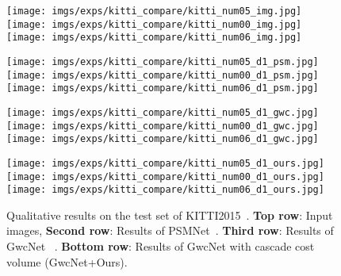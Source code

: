 \documentclass[10pt,twocolumn,letterpaper]{article}
\begin{document}
\begin{figure*}[t!]
\begin{center}
\def\col_k{0.30}
{\texttt{[image: imgs/exps/kitti\_compare/kitti\_num05\_img.jpg]}}
{\texttt{[image: imgs/exps/kitti\_compare/kitti\_num00\_img.jpg]}}
{\texttt{[image: imgs/exps/kitti\_compare/kitti\_num06\_img.jpg]}}

{\texttt{[image: imgs/exps/kitti\_compare/kitti\_num05\_d1\_psm.jpg]}}
{\texttt{[image: imgs/exps/kitti\_compare/kitti\_num00\_d1\_psm.jpg]}}
{\texttt{[image: imgs/exps/kitti\_compare/kitti\_num06\_d1\_psm.jpg]}}

{\texttt{[image: imgs/exps/kitti\_compare/kitti\_num05\_d1\_gwc.jpg]}}
{\texttt{[image: imgs/exps/kitti\_compare/kitti\_num00\_d1\_gwc.jpg]}}
{\texttt{[image: imgs/exps/kitti\_compare/kitti\_num06\_d1\_gwc.jpg]}}

{\texttt{[image: imgs/exps/kitti\_compare/kitti\_num05\_d1\_ours.jpg]}}
{\texttt{[image: imgs/exps/kitti\_compare/kitti\_num00\_d1\_ours.jpg]}}
{\texttt{[image: imgs/exps/kitti\_compare/kitti\_num06\_d1\_ours.jpg]}}

\end{center}
\vspace{-5mm}
 \caption{Qualitative results on the test set of KITTI2015~\cite{menze2015object}. \textbf{Top row}: Input images, \textbf{Second row}: Results of PSMNet~\cite{chang2018pyramid}. \textbf{Third row}: Results of GwcNet ~\cite{guo2019group}. \textbf{Bottom row}: Results of GwcNet with cascade cost volume (GwcNet+Ours).}
\label{fig:fig_stereo}
\end{figure*}
\end{document}
